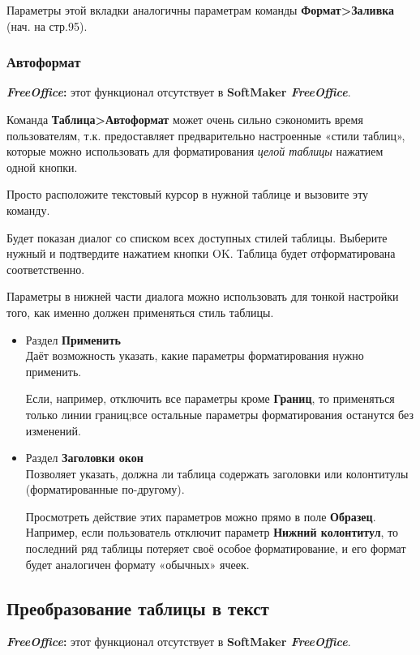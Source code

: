 \documentclass[a4paper,10pt]{article}
\begin{document}
Параметры этой вкладки аналогичны параметрам команды \textbf{Формат>Заливка} (нач. на стр.95).

\subsubsection{Автоформат}
\begin{mdframed}[backgroundcolor=pink!50]
\textbf{\textit{FreeOffice}:} этот функционал отсутствует в \textbf{SoftMaker \textit{FreeOffice}}.
\end{mdframed}

Команда \textbf{Таблица>Автоформат} может очень сильно сэкономить время пользователям, т.к. предоставляет предварительно настроенные «стили таблиц», которые можно использовать для форматирования \textit{целой таблицы} нажатием одной кнопки.

Просто расположите текстовый курсор в нужной таблице и вызовите эту команду.

Будет показан диалог со списком всех доступных стилей таблицы. Выберите нужный и подтвердите нажатием кнопки OK. Таблица будет отформатирована соответственно.

Параметры в нижней части диалога можно использовать для тонкой настройки того, как именно должен применяться стиль таблицы.

\begin{itemize}
 \item Раздел \textbf{Применить}\\
 Даёт возможность указать, какие параметры форматирования нужно применить.
 
 Если, например, отключить все параметры кроме \textbf{Границ}, то применяться только линии границ;все остальные параметры форматирования останутся без изменений.
 \item Раздел \textbf{Заголовки окон}\\
 Позволяет указать, должна ли таблица содержать заголовки или колонтитулы (форматированные по-другому).
 
 Просмотреть действие этих параметров можно прямо в поле \textbf{Образец}. Например, если пользователь отключит параметр \textbf{Нижний колонтитул}, то последний ряд таблицы потеряет своё особое форматирование, и его формат будет аналогичен формату «обычных» ячеек. 
\end{itemize}

\subsection{Преобразование таблицы в текст}
\begin{mdframed}[backgroundcolor=pink!50]
\textbf{\textit{FreeOffice}:} этот функционал отсутствует в \textbf{SoftMaker \textit{FreeOffice}}.
\end{mdframed}
\end{document}
